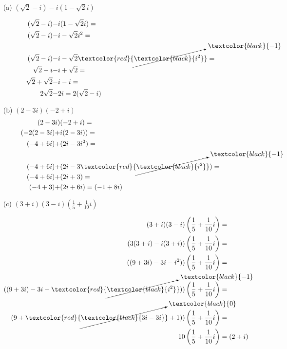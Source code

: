 \documentclass{article}
\newcommand{\canceling}[2]{\textcolor{red}{\cancelto{\textcolor{black}{#1}}{\textcolor{black}{#2}}}}
\begin{document}
\begin{enumerate}
    \item[(a)] $(\sqrt{2}-i)-i(1-\sqrt{2}i)$ 
    
      \vspace{.1cm} %
      \begin{align*}
         (\sqrt{2}-i)-&i(1-\sqrt{2}i)=\\
         (\sqrt{2}-i)-&i-\sqrt{2}i^2=\\
         (\sqrt{2}-i)-&i-\sqrt{2}\canceling{-1}{i^2}=\\
         \sqrt{2}-i-&i+\sqrt{2}=\\
         \sqrt{2}+\sqrt{2}-&i-i=\\
         2\sqrt{2}-&2i = 2(\sqrt{2}-i)  
       \end{align*}
    
    \item[(b)] $(2-3i)(-2+i)$ 
    \begin{align*}
      (2-3i)&(-2+i)=\\
      (-2(2-3i)+&i(2-3i))=\\
      (-4+6i)+&(2i-3i^2)=\\
      (-4+6i)+&(2i-3\canceling{-1}{i^2})=\\
      (-4+6i)+&(2i+3)=\\
      (-4 + 3)+&(2i+6i)=(-1 + 8i)
    \end{align*}
    
    \item[(c)] $(3+i)(3-i)\left(\frac{1}{5}+\frac{1}{10}i\right)$ 
    
   \begin{align*}
     (3+i)(3-i)&\left(\frac{1}{5}+\frac{1}{10}i\right)=\\
     (3(3+i)-i(3+i))&\left(\frac{1}{5}+\frac{1}{10}i\right)=\\
     ((9+3i)-3i-i^2))&\left(\frac{1}{5}+\frac{1}{10}i\right)=\\
     ((9+3i)-3i-\canceling{-1}{i^2}))&\left(\frac{1}{5}+\frac{1}{10}i\right)=\\
     (9+\canceling{0}{3i-3i}+1))&\left(\frac{1}{5}+\frac{1}{10}i\right)=\\
     10&\left(\frac{1}{5}+\frac{1}{10}i\right) = (2 + i)\\
   \end{align*}
    
\end{enumerate}
\end{document}
